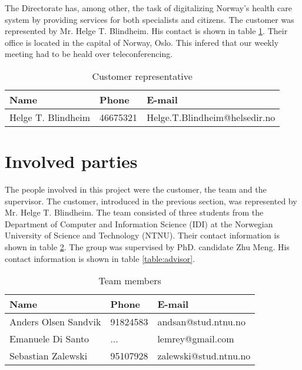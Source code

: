 The Directorate has, among other, the task of digitalizing Norway's health care system by providing services for both specialists and citizens.
The customer was represented by Mr. Helge T. Blindheim. His contact is shown in table \ref{table:client}. Their office is located in the capital of Norway, Oslo. This infered that our weekly meeting had to be heald over teleconferencing. 

\begin{table}[h]
\begin{center}
\begin{tabular}{ l | l | l }
  \hline
  Name & Phone & E-mail \\
  \hline\noalign{\smallskip}\noalign{\smallskip}\hline
  Helge T. Blindheim	& 46675321 & Helge.T.Blindheim@helsedir.no \\
  \hline
\end{tabular}
\end{center}
\caption{Customer representative}
\label{table:client}
\end{table}


\section{Involved parties}

The people involved in this project were the customer, the team and the supervisor.
The customer, introduced in the previous section, was represented by Mr. Helge T. Blindheim.
The team consisted of three students from the Department of Computer and Information Science (IDI) at the Norwegian University of Science and Technology (NTNU). Their contact information is shown in table \ref{table:team}. The group was supervised by PhD. candidate Zhu Meng. His contact information is shown in table \ref{table:advisor}.


\begin{table}[h]
\begin{center}
\begin{tabular}{ l | l | l }
  \hline
  Name & Phone & E-mail \\
  \hline\noalign{\smallskip}\noalign{\smallskip}\hline
  Anders Olsen Sandvik	& 91824583 & andsan@stud.ntnu.no \\
  Emanuele Di Santo		& ... & lemrey@gmail.com \\
  Sebastian Zalewski	& 95107928 & zalewski@stud.ntnu.no \\
  \hline
\end{tabular}
\end{center}
\caption{Team members}
\label{table:team}
\end{table}

